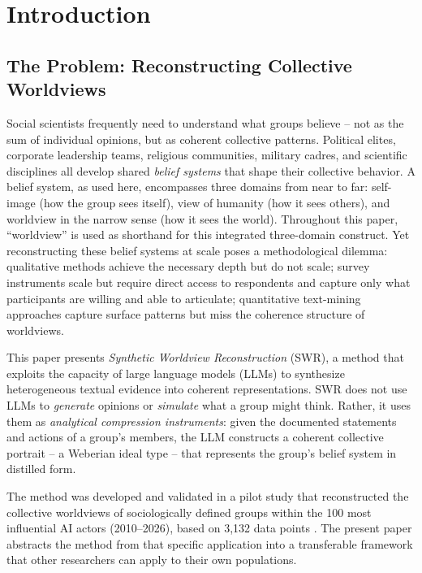 \documentclass[11pt,a4paper]{article}
\begin{document}
\section{Introduction}
\label{sec:introduction}

\subsection{The Problem: Reconstructing Collective Worldviews}
\label{sec:intro:problem}

Social scientists frequently need to understand what groups believe -- not as the sum of individual opinions, but as coherent collective patterns. Political elites, corporate leadership teams, religious communities, military cadres, and scientific disciplines all develop shared \emph{belief systems} that shape their collective behavior. A belief system, as used here, encompasses three domains from near to far: self-image (how the group sees itself), view of humanity (how it sees others), and worldview in the narrow sense (how it sees the world). Throughout this paper, ``worldview'' is used as shorthand for this integrated three-domain construct. Yet reconstructing these belief systems at scale poses a methodological dilemma: qualitative methods achieve the necessary depth but do not scale; survey instruments scale but require direct access to respondents and capture only what participants are willing and able to articulate; quantitative text-mining approaches capture surface patterns but miss the coherence structure of worldviews.

This paper presents \emph{Synthetic Worldview Reconstruction} (SWR), a method that exploits the capacity of large language models (LLMs) to synthesize heterogeneous textual evidence into coherent representations. SWR does not use LLMs to \emph{generate} opinions or \emph{simulate} what a group might think. Rather, it uses them as \emph{analytical compression instruments}: given the documented statements and actions of a group's members, the LLM constructs a coherent collective portrait -- a Weberian ideal type \citep{Weber1904} -- that represents the group's belief system in distilled form.

The method was developed and validated in a pilot study that reconstructed the collective worldviews of sociologically defined groups within the 100 most influential AI actors (2010--2026), based on 3,132 data points \citep{Geiger2026PaperA}. The present paper abstracts the method from that specific application into a transferable framework that other researchers can apply to their own populations.
\end{document}
